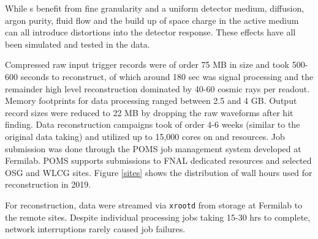 \documentclass[../main-v1.tex]{subfiles}
\begin{document}
While s benefit from fine granularity and a uniform detector medium, diffusion, argon purity, fluid flow and the build up of space charge in the active medium can all introduce distortions into the detector response.  These effects have all been simulated and tested in the  data. 

Compressed raw input trigger records were of order 75 MB in size and took 500-600 seconds to reconstruct, of which around 180 sec was signal processing and the remainder high level reconstruction dominated by 40-60 cosmic rays per readout.  Memory footprints for data processing ranged between 2.5 and 4 GB.  Output   record sizes were reduced to 22 MB by dropping the raw waveforms after hit finding.   Data reconstruction campaigns took of order 4-6 weeks (similar to the original data taking) and utilized up to 15,000 cores on  and  resources.  Job submission was done through the POMS\cite{poms} job management system developed at Fermilab. POMS supports submissions to FNAL dedicated resources and selected OSG and WLCG sites.  Figure \ref{sites} shows the distribution of wall hours used for reconstruction in 2019. 

For reconstruction, data were streamed via {\tt xrootd}\cite{Behrmann:2011zz} from  storage at Fermilab to the remote sites. Despite individual processing jobs taking 15-30 hrs to complete, network interruptions rarely caused job failures. 
\end{document}
